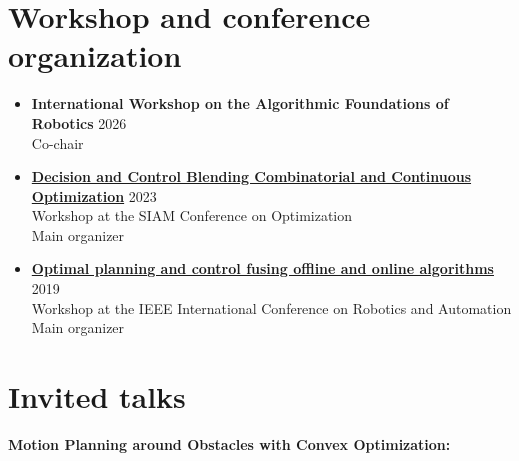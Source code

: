 \documentclass[11pt,a4paper,sans]{moderncv}
\begin{document}
%

\section{Workshop and conference organization}

\vspace{5pt}

\begin{itemize}
	
\item \textbf{International Workshop on the Algorithmic Foundations of Robotics} \hfill 2026 \\
Co-chair

\item\href{https://meetings.siam.org/sess/dsp_programsess.cfm?SESSIONCODE=76788}{\color{cyan}\textbf{Decision and Control Blending Combinatorial and Continuous Optimization}} \hfill 2023 \\
Workshop at the SIAM Conference on Optimization \\
Main organizer

\item\href{https://sites.google.com/mit.edu/icra19ws}{\color{cyan}\textbf{Optimal planning and control fusing offline and online algorithms}} \hfill 2019 \\
Workshop at the IEEE International Conference on Robotics and Automation \\
Main organizer


\end{itemize}


\section{Invited talks}

\vspace{5pt}

\textbf{Motion Planning around Obstacles with Convex Optimization:}
\end{document}
